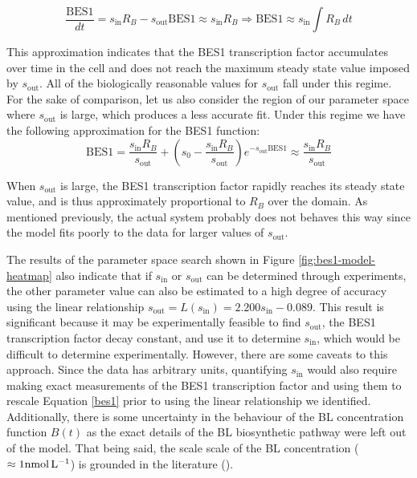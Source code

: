 \begin{equation}
\label{bes1-sout-small}
\frac{\text{BES1}}{dt} = s_{\text{in}}R_{B} - s_{\text{out}}\text{BES1} \approx s_{\text{in}}R_{B} \Rightarrow \text{BES1} \approx s_{\text{in}} \int R_{B} \, dt
\end{equation}

This approximation indicates that the BES1 transcription factor accumulates over time in the cell and does not reach the maximum steady state value imposed by $s_{\text{out}}$. All of the biologically reasonable values for $s_{\text{out}}$ fall under this regime. For the sake of comparison, let us also consider the region of our parameter space where $s_{\text{out}}$ is large, which produces a less accurate fit. Under this regime we have the following approximation for the BES1 function:
$$
\text{BES1} = \frac{s_{\text{in}}R_{B}}{s_{\text{out}}} + \left( s_{0} - \frac{s_{\text{in}}R_{B}}{s_{\text{out}}} \right) e^{-s_{\text{out}}\text{BES1}} \approx \frac{s_{\text{in}}R_{B}}{s_{\text{out}}}
$$

When $s_{\text{out}}$ is large, the BES1 transcription factor rapidly reaches its steady state value, and is thus approximately proportional to $R_{B}$ over the domain. As mentioned previously, the actual system probably does not behaves this way since the model fits poorly to the data for larger values of $s_{\text{out}}$.

\medskip

The results of the parameter space search shown in Figure \ref{fig:bes1-model-heatmap} also indicate that if $s_{\text{in}}$ or $s_{\text{out}}$ can be determined through experiments, the other parameter value can also be estimated to a high degree of accuracy using the linear relationship $s_{\text{out}} = L(s_{\text{in}}) = 2.200s_{\text{in}} - 0.089$. This result is significant because it may be experimentally feasible to find $s_{\text{out}}$, the BES1 transcription factor decay constant, and use it to determine $s_{\text{in}}$, which would be difficult to determine experimentally. However, there are some caveats to this approach. Since the data has arbitrary units, quantifying $s_{\text{in}}$ would also require making exact measurements of the BES1 transcription factor and using them to rescale Equation \eqref{bes1} prior to using the linear relationship we identified. Additionally, there is some uncertainty in the behaviour of the BL concentration function $B(t)$ as the exact details of the BL biosynthetic pathway were left out of the model. That being said, the scale scale of the BL concentration ($\approx 1\nm$) is grounded in the literature (\cite{vanesse2012}). 
